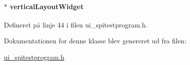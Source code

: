 \paragraph[{\texorpdfstring{vertical\+Layout\+Widget}{verticalLayoutWidget}}]{$\ast$ vertical\+Layout\+Widget\hspace{0.3cm}{\ttfamily [inherited]}}\hypertarget{class_ui___spi_test_program_a4dab2ee47678bbea22fe10267a009293}{}\label{class_ui___spi_test_program_a4dab2ee47678bbea22fe10267a009293}


Defineret på linje 44 i filen ui\+\_\+spitestprogram.\+h.



Dokumentationen for denne klasse blev genereret ud fra filen\+:\begin{DoxyCompactItemize}
\item 
\hyperlink{ui__spitestprogram_8h}{ui\+\_\+spitestprogram.\+h}\end{DoxyCompactItemize}
